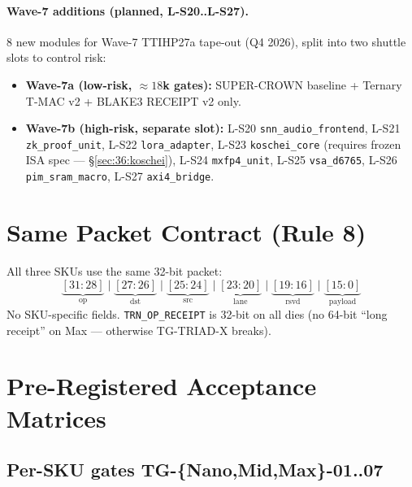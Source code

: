 \paragraph{Wave-7 additions (planned, L-S20..L-S27).}
8 new modules for Wave-7 TTIHP27a tape-out (Q4 2026), split into two
shuttle slots to control risk:
\begin{itemize}
  \item \textbf{Wave-7a (low-risk, $\approx 18$k gates):} SUPER-CROWN baseline + Ternary T-MAC v2 + BLAKE3 RECEIPT v2 only.
  \item \textbf{Wave-7b (high-risk, separate slot):} L-S20 \texttt{snn\_audio\_frontend}, L-S21 \texttt{zk\_proof\_unit}, L-S22 \texttt{lora\_adapter}, L-S23 \texttt{koschei\_core} (requires frozen ISA spec --- \S\ref{sec:36:koschei}), L-S24 \texttt{mxfp4\_unit}, L-S25 \texttt{vsa\_d6765}, L-S26 \texttt{pim\_sram\_macro}, L-S27 \texttt{axi4\_bridge}.
\end{itemize}

\section{Same Packet Contract (Rule 8)}
\label{sec:36:packet}

All three SKUs use the same 32-bit packet:
\[
\underbrace{[31{:}28]}_{\text{op}} \;\big|\;
\underbrace{[27{:}26]}_{\text{dst}} \;\big|\;
\underbrace{[25{:}24]}_{\text{src}} \;\big|\;
\underbrace{[23{:}20]}_{\text{lane}} \;\big|\;
\underbrace{[19{:}16]}_{\text{rsvd}} \;\big|\;
\underbrace{[15{:}0]}_{\text{payload}}
\]
No SKU-specific fields. \texttt{TRN\_OP\_RECEIPT} is 32-bit on all dies
(no 64-bit \enquote{long receipt} on Max --- otherwise TG-TRIAD-X breaks).

\section{Pre-Registered Acceptance Matrices}
\label{sec:36:gates}

\subsection{Per-SKU gates TG-\{Nano,Mid,Max\}-01..07}


